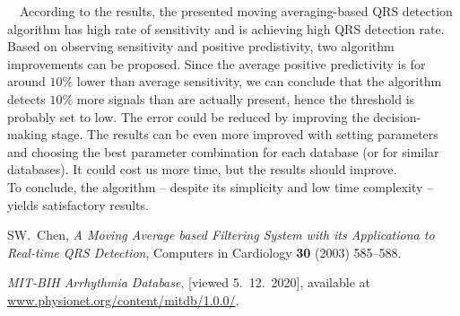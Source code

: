 \documentclass[a4paper,11pt]{article}
\begin{document}
\ \ According to the results, the presented moving averaging-based QRS detection algorithm has high rate of sensitivity and is achieving high QRS detection rate. 
Based on observing sensitivity and positive predistivity, two algorithm improvements can be proposed.
Since the average positive predictivity is for around $10 \%$ lower than average sensitivity, we can conclude that the algorithm detects $10 \%$ more signals than are actually present,
hence the threshold is probably set to low.
The error could be reduced by improving the decision-making stage.
The results can be even more improved with setting parameters and choosing the best parameter combination for each database (or for similar databases). It could cost us more time, but the results should improve.
\\
To conclude, the algorithm -- despite its simplicity and low time complexity -- yields satisfactory results.


\begin{thebibliography}{99}

    SW.~Chen, \emph{A Moving Average based Filtering System with its Applicationa to Real-time QRS Detection}, Computers in Cardiology \textbf{30} (2003) 585--588.

    \emph{MIT-BIH Arrhythmia Database}, [viewed 5.~12.~2020], available at \url{www.physionet.org/content/mitdb/1.0.0/}.

\end{thebibliography}
\end{document}

